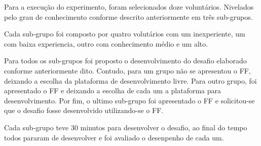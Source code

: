 Para a execução do experimento, foram selecionados doze voluntários. Nivelados pelo grau de
conhecimento conforme descrito anteriormente em três sub-grupos.

Cada sub-grupo foi composto por quatro volutários com um inexperiente, um com baixa experiencia, outro com
conhecimento médio e um alto.

Para todos os sub-grupos foi proposto o desenvolvimento do desafio elaborado conforme anteriormente dito. Contudo,
para um grupo não se apresentou o FF, deixando a escolha da plataforma de desenvolvimento livre. Para outro grupo,
foi apresentado o FF e deixando a escolha de cada um a plataforma para desenvolvimento. Por fim, o ultimo sub-grupo
foi apresentado o FF e solicitou-se que o desafio fosse desenvolvido utilizando-se o FF.

Cada sub-grupo teve 30 minutos para desenvolver o desafio, ao final do tempo todos pararam de desenvolver
e foi avaliado o desenpenho de cada um.
